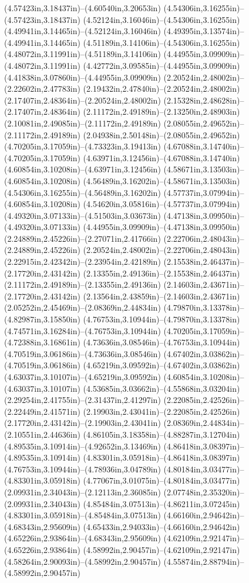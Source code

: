 (4.57423in,3.18437in)--(4.60540in,3.20653in) (4.54306in,3.16255in)--(4.57423in,3.18437in) (4.52124in,3.16046in)--(4.54306in,3.16255in) (4.49941in,3.14465in)--(4.52124in,3.16046in) (4.49395in,3.13574in)--(4.49941in,3.14465in) (4.51189in,3.14106in)--(4.54306in,3.16255in) (4.48072in,3.11991in)--(4.51189in,3.14106in) (4.44955in,3.09909in)--(4.48072in,3.11991in) (4.42772in,3.09585in)--(4.44955in,3.09909in) (4.41838in,3.07860in)--(4.44955in,3.09909in) (2.20524in,2.48002in)--(2.22602in,2.47783in) (2.19432in,2.47840in)--(2.20524in,2.48002in) (2.17407in,2.48364in)--(2.20524in,2.48002in) (2.15328in,2.48628in)--(2.17407in,2.48364in) (2.11172in,2.49189in)--(2.13250in,2.48903in) (2.10081in,2.49085in)--(2.11172in,2.49189in) (2.08055in,2.49652in)--(2.11172in,2.49189in) (2.04938in,2.50148in)--(2.08055in,2.49652in) (4.70205in,3.17059in)--(4.73323in,3.19413in) (4.67088in,3.14740in)--(4.70205in,3.17059in) (4.63971in,3.12456in)--(4.67088in,3.14740in) (4.60854in,3.10208in)--(4.63971in,3.12456in) (4.58671in,3.13503in)--(4.60854in,3.10208in) (4.56489in,3.16202in)--(4.58671in,3.13503in) (4.54306in,3.16255in)--(4.56489in,3.16202in) (4.57737in,3.07994in)--(4.60854in,3.10208in) (4.54620in,3.05816in)--(4.57737in,3.07994in) (4.49320in,3.07133in)--(4.51503in,3.03673in) (4.47138in,3.09950in)--(4.49320in,3.07133in) (4.44955in,3.09909in)--(4.47138in,3.09950in) (2.24889in,2.45226in)--(2.27071in,2.41766in) (2.22706in,2.48043in)--(2.24889in,2.45226in) (2.20524in,2.48002in)--(2.22706in,2.48043in) (2.22915in,2.42342in)--(2.23954in,2.42189in) (2.15538in,2.46437in)--(2.17720in,2.43142in) (2.13355in,2.49136in)--(2.15538in,2.46437in) (2.11172in,2.49189in)--(2.13355in,2.49136in) (2.14603in,2.43671in)--(2.17720in,2.43142in) (2.13564in,2.43859in)--(2.14603in,2.43671in) (2.05252in,2.45469in)--(2.08369in,2.44834in) (4.79870in,3.13378in)--(4.82987in,3.15850in) (4.76753in,3.10944in)--(4.79870in,3.13378in) (4.74571in,3.16284in)--(4.76753in,3.10944in) (4.70205in,3.17059in)--(4.72388in,3.16861in) (4.73636in,3.08546in)--(4.76753in,3.10944in) (4.70519in,3.06186in)--(4.73636in,3.08546in) (4.67402in,3.03862in)--(4.70519in,3.06186in) (4.65219in,3.09592in)--(4.67402in,3.03862in) (4.63037in,3.10107in)--(4.65219in,3.09592in) (4.60854in,3.10208in)--(4.63037in,3.10107in) (4.53685in,3.03662in)--(4.55868in,3.03204in) (2.29254in,2.41755in)--(2.31437in,2.41297in) (2.22085in,2.42526in)--(2.22449in,2.41571in) (2.19903in,2.43041in)--(2.22085in,2.42526in) (2.17720in,2.43142in)--(2.19903in,2.43041in) (2.08369in,2.44834in)--(2.10551in,2.44636in) (4.86105in,3.18358in)--(4.88287in,3.12704in) (4.89535in,3.10914in)--(4.92652in,3.13469in) (4.86418in,3.08397in)--(4.89535in,3.10914in) (4.83301in,3.05918in)--(4.86418in,3.08397in) (4.76753in,3.10944in)--(4.78936in,3.04789in) (4.80184in,3.03477in)--(4.83301in,3.05918in) (4.77067in,3.01075in)--(4.80184in,3.03477in) (2.09931in,2.34043in)--(2.12113in,2.36085in) (2.07748in,2.35320in)--(2.09931in,2.34043in) (4.85484in,3.07513in)--(4.86211in,3.07245in) (4.83301in,3.05918in)--(4.85484in,3.07513in) (4.66160in,2.94642in)--(4.68343in,2.95609in) (4.65433in,2.94033in)--(4.66160in,2.94642in) (4.65226in,2.93864in)--(4.68343in,2.95609in) (4.62109in,2.92147in)--(4.65226in,2.93864in) (4.58992in,2.90457in)--(4.62109in,2.92147in) (4.58264in,2.90093in)--(4.58992in,2.90457in) (4.55874in,2.88794in)--(4.58992in,2.90457in) 